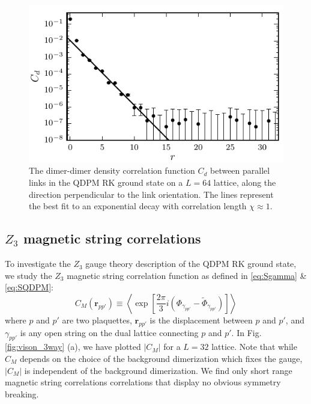 \documentclass[twocolumn,prb,aps,floatfix,superscriptaddress]{revtex4-1}
\newcommand{\figref}[1]{Fig. \ref{#1}}
\begin{document}
\begin{figure}
    \centering
    \includegraphics[width=1.0\columnwidth]{spatial_cors_parallel.pdf}
    \caption{The dimer-dimer density correlation function $C_d$ between parallel links in the QDPM RK ground state on a $L=64$ lattice, along the direction perpendicular to the link orientation.  The lines represent the best fit to an exponential decay with correlation length $\chi\approx 1$.}
    \label{fig:spatial_dmr_cor}
\end{figure}

\subsection{$Z_3$ magnetic string correlations}



To investigate the $Z_3$ gauge theory description of the QDPM RK ground state, we study the $Z_3$ magnetic string correlation function as defined in \eqref{eq:Sgamma} \& \eqref{eq:SQDPM}:
\begin{equation}
C_M \left( \bm{r}_{pp'} \right) \equiv \left \langle \exp \left[ \frac{2 \pi}{3} i \left( \Phi_{\gamma_{pp'}} -\tilde{\Phi}_{\gamma_{pp'}} \right) \right] \right \rangle
\end{equation}
where $p$ and $p'$ are two plaquettes, $\bm{r}_{pp'}$ is the displacement between $p$ and $p'$,  and $\gamma_{pp'}$ is any open string on the dual lattice
connecting $p$ and $p'$. In \figref{fig:vison_3way} (a), we have plotted $|C_M|$ for a $L=32$ lattice. Note that while $C_M$ depends on the choice of the background dimerization which fixes the gauge, $|C_M|$ is independent of the background dimerization. We find only short range magnetic string correlations correlations that display no obvious symmetry breaking. 
\end{document}
